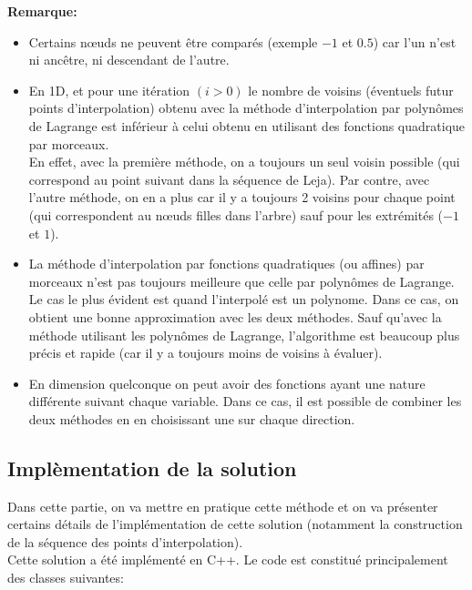 \textbf{Remarque:}
\begin{itemize}
\item Certains nœuds ne peuvent être comparés (exemple $-1$ et $0.5$) car l'un n'est ni ancêtre, ni descendant de l'autre.\\
\item En 1D, et pour une itération $(i>0)$ le nombre de voisins (éventuels futur points d'interpolation) obtenu avec la méthode d'interpolation par polynômes de Lagrange est inférieur
à celui obtenu en utilisant des fonctions quadratique par morceaux. \\
En effet, avec la première méthode, on a toujours un seul voisin possible (qui correspond au point suivant dans la séquence de Leja).
Par contre, avec l'autre méthode, on en a plus car il y a toujours 2 voisins pour chaque point (qui correspondent au nœuds filles dans l'arbre) sauf pour les extrémités ($-1$ et $1$).
\item La méthode d'interpolation par fonctions quadratiques (ou affines) par morceaux n'est pas toujours meilleure que celle par polynômes de Lagrange.
Le cas le plus évident est quand l'interpolé est un polynome. Dans ce cas, on obtient une bonne approximation avec les deux méthodes.
Sauf qu'avec la méthode utilisant les polynômes de Lagrange, l'algorithme est beaucoup plus précis et rapide (car il y a toujours moins de voisins à évaluer).
\item En dimension quelconque on peut avoir des fonctions ayant une nature différente suivant chaque variable. Dans ce cas, il est possible de combiner les deux méthodes en en choisissant une sur chaque direction.
\end{itemize}

\subsection{Implèmentation de la solution}\label{sec:5}
Dans cette partie, on va mettre en pratique cette méthode et on va présenter certains détails
de l'implémentation de cette solution (notamment la construction de la séquence des points d'interpolation).\\
Cette solution a été implémenté en C++. Le code est constitué principalement des classes suivantes:

